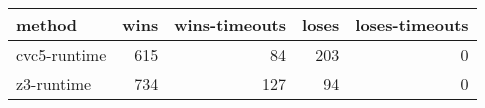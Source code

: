 \begin{tabular}{lrrrr}
\hline
 method       &   wins &   wins-timeouts &   loses &   loses-timeouts \\
\hline
 cvc5-runtime &    615 &              84 &     203 &                0 \\
 z3-runtime   &    734 &             127 &      94 &                0 \\
\hline
\end{tabular}
